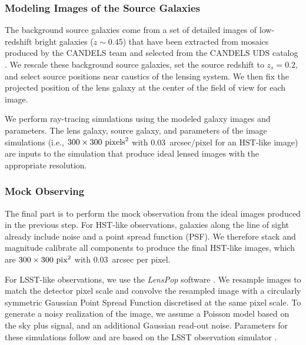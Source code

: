 \documentclass{emulateapj}
\begin{document}
\subsubsection{Modeling Images of the Source Galaxies}
The background source galaxies come from a set of detailed images of
low-redshift bright galaxies ($z\sim0.45$) that have been extracted
from mosaics produced by the CANDELS team
\citep{grogin_etal11,koekemoer_etal11} and selected from the CANDELS
UDS catalog \citep{galametz_etal13}.  We rescale these background
source galaxies, set the source redshift to $z_s=0.2$, and select
source positions near caustics of the lensing system.  We then fix the
projected position of the lens galaxy at the center of the field of
view for each image.

We perform ray-tracing simulations using the modeled galaxy images and
parameters.  The lens galaxy, source galaxy, and parameters of the
image simulations (i.e., $300 \times 300~{\rm pixels}^2$ with
0.03~arcsec/pixel for an HST-like image) are inputs to the simulation
that produce ideal lensed images with the appropriate resolution.

\subsubsection{Mock Observing}

The final part is to perform the mock observation from the ideal
images produced in the previous step. For HST-like observations,
galaxies along the line of sight already include noise and a point
spread function (PSF).  We therefore stack and magnitude calibrate all
components to produce the final HST-like images, which are
$300\times300~{\rm pix}^2$ with $0.03$~arcsec per pixel.

For LSST-like observations, we use the {\em LensPop} software
\citep{collett_15}.  We resample images to match the detector pixel
scale and convolve the resampled image with a circularly symmetric
Gaussian Point Spread Function discretised at the same pixel scale. To
generate a noisy realization of the image, we assume a Poisson model
based on the sky plus signal, and an additional Gaussian read-out
noise. Parameters for these simulations follow \citet{collett_15} and
are based on the LSST observation simulator \citep{connolly_etal10}.
\end{document}

